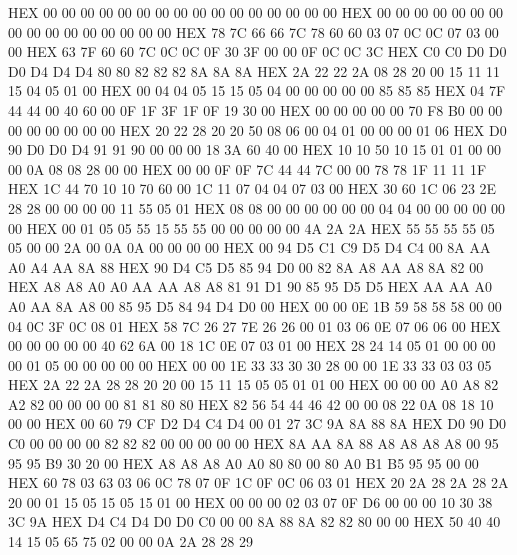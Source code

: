 \documentclass[10pt]{report}
\begin{document}
\nwenddocs{}\endmoddef\nwstartdeflinemarkup\nwenddeflinemarkup
    HEX     00 00 00 00 00 00 00 00 00 00 00 00 00 00 00 00
    HEX     00 00 00 00 00 00 00 00 00 00 00 00 00 00 00 00
    HEX     78 7C 66 66 7C 78 60 60 03 07 0C 0C 07 03 00 00
    HEX     63 7F 60 60 7C 0C 0C 0F 30 3F 00 00 0F 0C 0C 3C
    HEX     C0 C0 D0 D0 D0 D4 D4 D4 80 80 82 82 82 8A 8A 8A
    HEX     2A 22 22 2A 08 28 20 00 15 11 11 15 04 05 01 00
    HEX     00 04 04 05 15 15 05 04 00 00 00 00 00 85 85 85
    HEX     04 7F 44 44 00 40 60 00 0F 1F 3F 1F 0F 19 30 00
    HEX     00 00 00 00 00 70 F8 B0 00 00 00 00 00 00 00 00
    HEX     20 22 28 20 20 50 08 06 00 04 01 00 00 00 01 06
    HEX     D0 90 D0 D0 D4 91 91 90 00 00 00 18 3A 60 40 00
    HEX     10 10 50 10 15 01 01 00 00 00 0A 08 08 28 00 00
    HEX     00 00 0F 0F 7C 44 44 7C 00 00 78 78 1F 11 11 1F
    HEX     1C 44 70 10 10 70 60 00 1C 11 07 04 04 07 03 00
    HEX     30 60 1C 06 23 2E 28 28 00 00 00 00 11 55 05 01
    HEX     08 08 00 00 00 00 00 00 04 04 00 00 00 00 00 00
    HEX     00 01 05 05 55 15 55 55 00 00 00 00 00 4A 2A 2A
    HEX     55 55 55 55 05 05 00 00 2A 00 0A 0A 00 00 00 00
    HEX     00 94 D5 C1 C9 D5 D4 C4 00 8A AA A0 A4 AA 8A 88
    HEX     90 D4 C5 D5 85 94 D0 00 82 8A A8 AA A8 8A 82 00
    HEX     A8 A8 A0 A0 AA AA A8 A8 81 91 D1 90 85 95 D5 D5
    HEX     AA AA A0 A0 AA 8A A8 00 85 95 D5 84 94 D4 D0 00
    HEX     00 00 0E 1B 59 58 58 58 00 00 04 0C 3F 0C 08 01
    HEX     58 7C 26 27 7E 26 26 00 01 03 06 0E 07 06 06 00
    HEX     00 00 00 00 00 40 62 6A 00 18 1C 0E 07 03 01 00
    HEX     28 24 14 05 01 00 00 00 00 01 05 00 00 00 00 00
    HEX     00 00 1E 33 33 30 30 28 00 00 1E 33 33 03 03 05
    HEX     2A 22 2A 28 28 20 20 00 15 11 15 05 05 01 01 00
    HEX     00 00 00 A0 A8 82 A2 82 00 00 00 00 81 81 80 80
    HEX     82 56 54 44 46 42 00 00 08 22 0A 08 18 10 00 00
    HEX     00 60 79 CF D2 D4 C4 D4 00 01 27 3C 9A 8A 88 8A
    HEX     D0 90 D0 C0 00 00 00 00 82 82 82 00 00 00 00 00
    HEX     8A AA 8A 88 A8 A8 A8 A8 00 95 95 95 B9 30 20 00
    HEX     A8 A8 A8 A0 A0 80 80 00 80 A0 B1 B5 95 95 00 00
    HEX     60 78 03 63 03 06 0C 78 07 0F 1C 0F 0C 06 03 01
    HEX     20 2A 28 2A 28 2A 20 00 01 15 05 15 05 15 01 00
    HEX     00 00 00 02 03 07 0F D6 00 00 00 10 30 38 3C 9A
    HEX     D4 C4 D4 D0 D0 C0 00 00 8A 88 8A 82 82 80 00 00
    HEX     50 40 40 14 15 05 65 75 02 00 00 0A 2A 28 28 29
\end{document}
